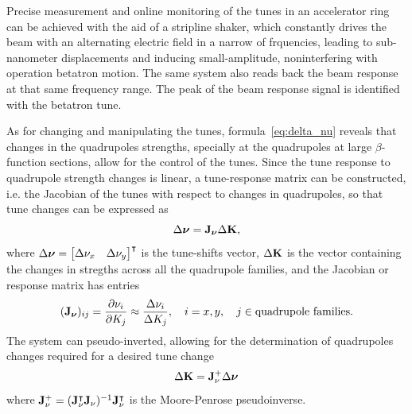Precise measurement and online monitoring of the tunes in an accelerator ring can be achieved with the aid of a stripline shaker, which constantly drives the beam with an alternating electric field in a narrow of frquencies, leading to sub-nanometer displacements and inducing small-amplitude, noninterfering with operation betatron motion. The same system also reads back the beam response at that same frequency range. The peak of the beam response signal is identified with the betatron tune.

As for changing and manipulating the tunes, formula~\eqref{eq:delta_nu} reveals that changes in the quadrupoles strengths, specially at the quadrupoles at large $\beta$-function sections, allow for the control of the tunes.  Since the tune response to quadrupole strength changes is linear, a tune-response matrix can be constructed, i.e. the Jacobian of the tunes with respect to changes in quadrupoles, so that tune changes can be expressed as
\begin{equation}
    \Delta\boldsymbol{\nu} = \vb{J}_{\boldsymbol{\nu}}\Delta \vb{K},
\end{equation}
where $\Delta\boldsymbol{\nu} = \mqty*[\Delta \nu_x & \Delta \nu_y]^\intercal$ is the tune-shifts vector, $\Delta \vb{K}$ is the vector containing the changes in stregths across all the quadrupole families, and the Jacobian or response matrix has entries
\begin{equation}
    (\vb{J}_{\boldsymbol{\nu}})_{ij} = \pdv{\nu_{i}}{K_j} \approx \frac{\Delta \nu_{i}}{\Delta K_j}, \quad i=x, y,\quad j\in\text{quadrupole families}.
\end{equation}
The system can pseudo-inverted, allowing for the determination of quadrupoles changes required for a desired tune change
\begin{equation}
    \Delta \vb{K} = \vb{J}_{\nu}^{+}\Delta \boldsymbol{\nu}
\end{equation}
where $\vb{J}_{\nu}^{+} = (\vb{J}_{\nu}^{\intercal}\vb{J}_{\nu})^{-1}\vb{J}_{\nu}^{\intercal}$ is the Moore-Penrose pseudoinverse.
